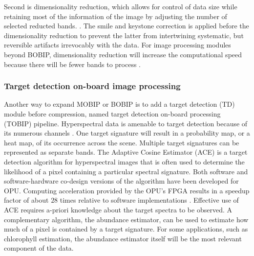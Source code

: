 Second is dimensionality reduction, which allows for control of data size while retaining most of the information of the image by adjusting the number of selected reducted bands. \cite{Vit17}. 
The smile and keystone correction is applied before the dimensionality reduction to prevent the latter from intertwining systematic, but reversible artifacts irrevocably with the data. For image processing modules beyond BOBIP, dimensionality reduction will increase the computational speed because there will be fewer bands to process \cite{Bakken2019SPIE}.


\subsubsection{Target detection on-board image processing}
Another way to expand MOBIP or BOBIP is to add a target detection (TD) module before compression, named target detection on-board processing (TOBIP) pipeline. Hyperspectral data is amenable to target detection because of its numerous channels \cite{Manolakis2002, Manolakis2005}. One target signature will result in a probability map, or a heat map, of its occurrence across the scene. Multiple target signatures can be represented as separate bands. 
The Adaptive Cosine Estimator (ACE) is a target detection algorithm for hyperspectral images that is often used to determine the likelihood of a pixel containing a particular spectral signature. 
Both software and software-hardware co-design versions of the algorithm have been developed for OPU. Computing acceleration provided by the OPU's FPGA results in a speedup factor of about $28$ times relative to software implementations \cite{dijehw19_meco}. Effective use of ACE requires a-priori knowledge about the target spectra to be observed. 
A complementary algorithm, the abundance estimator, can be used to estimate how much of a pixel is contained by a target signature. 
For some applications, such as chlorophyll estimation, the abundance estimator itself will be the most relevant component of the data. 

